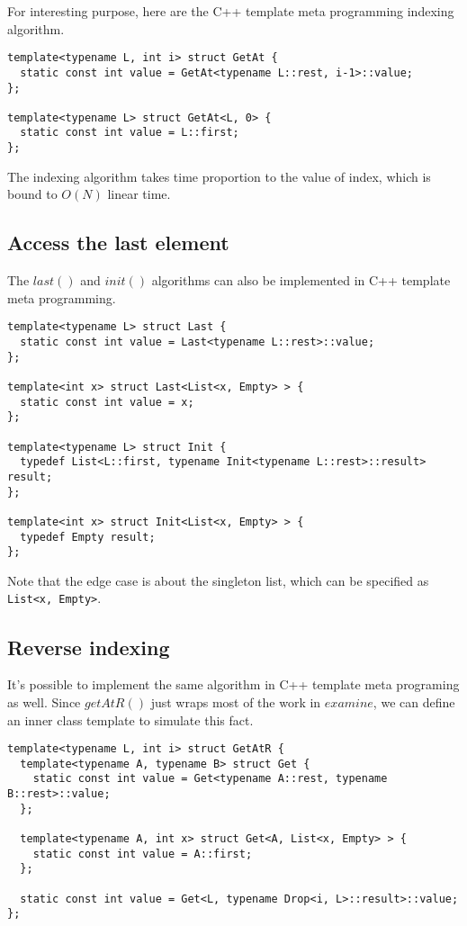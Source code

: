 \documentclass{article}
\begin{document}
For interesting purpose, here are the C++ template meta programming indexing algorithm.

\lstset{language=C++}
\begin{lstlisting}
template<typename L, int i> struct GetAt {
  static const int value = GetAt<typename L::rest, i-1>::value;
};

template<typename L> struct GetAt<L, 0> {
  static const int value = L::first;
};
\end{lstlisting}

The indexing algorithm takes time proportion to the value of index, which is bound to $O(N)$
linear time. 

\subsection{Access the last element}

The $last()$ and $init()$ algorithms can also be implemented in C++ template meta programming.

\lstset{language=C++}
\begin{lstlisting}
template<typename L> struct Last {
  static const int value = Last<typename L::rest>::value;
};

template<int x> struct Last<List<x, Empty> > {
  static const int value = x;
};

template<typename L> struct Init {
  typedef List<L::first, typename Init<typename L::rest>::result> result;
};

template<int x> struct Init<List<x, Empty> > {
  typedef Empty result;
};
\end{lstlisting}

Note that the edge case is about the singleton list, which can be specified as \verb|List<x, Empty>|.

\subsection{Reverse indexing}
It's possible to implement the same algorithm in C++ template meta programing as well.
Since $getAtR()$ just wraps most of the work in $examine$, we can define an inner
class template to simulate this fact.

\lstset{language=C++}
\begin{lstlisting}
template<typename L, int i> struct GetAtR {
  template<typename A, typename B> struct Get {
    static const int value = Get<typename A::rest, typename B::rest>::value;
  };

  template<typename A, int x> struct Get<A, List<x, Empty> > {
    static const int value = A::first;
  };

  static const int value = Get<L, typename Drop<i, L>::result>::value;
};
\end{lstlisting}
\end{document}
